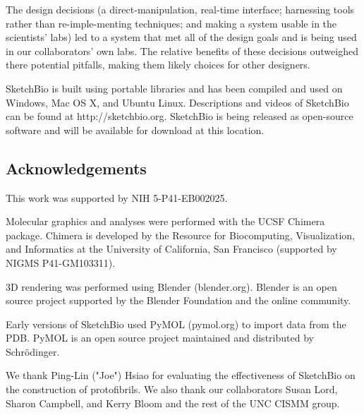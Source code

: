 \documentclass[twocolumn]{bmcart}%
\begin{document}
The design decisions (a direct-manipulation, real-time interface; harnessing tools rather than re-imple-menting techniques; and making a system usable in the scientists' labs) led to a system that met all of the design goals and is being used in our collaborators' own labs.
The relative benefits of these decisions outweighed there potential pitfalls, making them likely choices for other designers.

SketchBio is built using portable libraries and has been compiled and used on Windows, Mac OS X, and Ubuntu Linux.
Descriptions and videos of SketchBio can be found at http://sketchbio.org.
SketchBio is being released as open-source software and will be available for download at this location.

\subsection*{Acknowledgements}
This work was supported by NIH 5-P41-EB002025.

Molecular graphics and analyses were performed with the UCSF Chimera package.
Chimera is developed by the Resource for Biocomputing, Visualization, and Informatics at the University of California, San Francisco (supported by NIGMS P41-GM103311).

3D rendering was performed using Blender (blender.org).
Blender is an open source project supported by the Blender Foundation and the online community.

Early versions of SketchBio used PyMOL (pymol.org) to import data from the PDB.
PyMOL is an open source project maintained and distributed by Schrödinger.

We thank Ping-Lin ("Joe") Hsiao for evaluating the effectiveness of SketchBio on the construction of protofibrils. We also thank our collaborators Susan Lord, Sharon Campbell, and Kerry Bloom and the rest of the UNC CISMM group.

\end{document}
